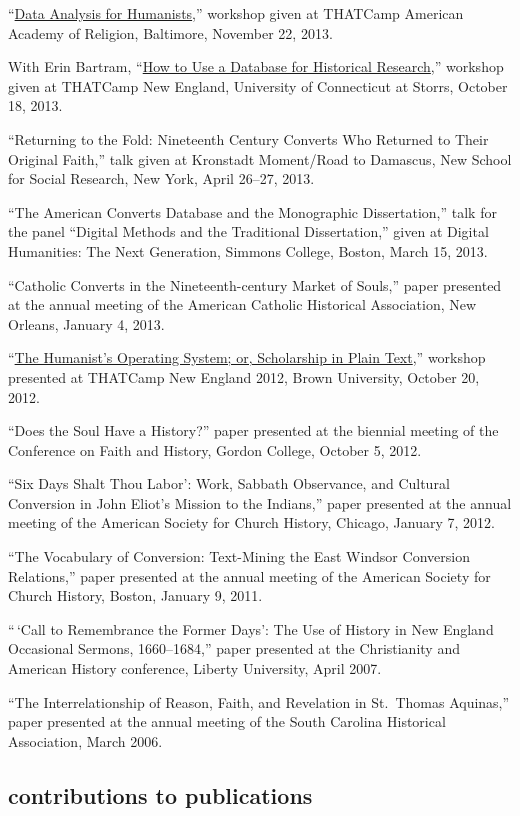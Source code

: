 \documentclass[11pt]{article}
\begin{document}
``\href{/workshops/}{Data Analysis for Humanists},'' workshop given at
THATCamp American Academy of Religion, Baltimore, November 22, 2013.

With Erin Bartram, ``\href{/workshops/}{How to Use a Database for
  Historical Research},'' workshop given at THATCamp New England,
University of Connecticut at Storrs, October 18, 2013.

``Returning to the Fold: Nineteenth Century Converts Who Returned to
Their Original Faith,'' talk given at Kronstadt Moment/Road to Damascus,
New School for Social Research, New York, April 26--27, 2013.

``The American Converts Database and the Monographic Dissertation,''
talk for the panel ``Digital Methods and the Traditional Dissertation,''
given at Digital Humanities: The Next Generation, Simmons College,
Boston, March 15, 2013.

``Catholic Converts in the Nineteenth-century Market of Souls,'' paper
presented at the annual meeting of the American Catholic Historical
Association, New Orleans, January 4, 2013.

``\href{/workshops/}{The Humanist's Operating System; or, Scholarship in
  Plain Text},'' workshop presented at THATCamp New England 2012, Brown
University, October 20, 2012.

``Does the Soul Have a History?'' paper presented at the biennial
meeting of the Conference on Faith and History, Gordon College, October
5, 2012.

``Six Days Shalt Thou Labor': Work, Sabbath Observance, and Cultural
Conversion in John Eliot's Mission to the Indians,'' paper presented at
the annual meeting of the American Society for Church History, Chicago,
January 7, 2012.

``The Vocabulary of Conversion: Text-Mining the East Windsor Conversion
Relations,'' paper presented at the annual meeting of the American
Society for Church History, Boston, January 9, 2011.

``\,`Call to Remembrance the Former Days': The Use of History in New
England Occasional Sermons, 1660--1684,'' paper presented at the
Christianity and American History conference, Liberty University, April
2007.

``The Interrelationship of Reason, Faith, and Revelation in St.~Thomas
Aquinas,'' paper presented at the annual meeting of the South Carolina
Historical Association, March 2006.

\subsection{contributions to
  publications}\label{contributions-to-publications}
\end{document}
